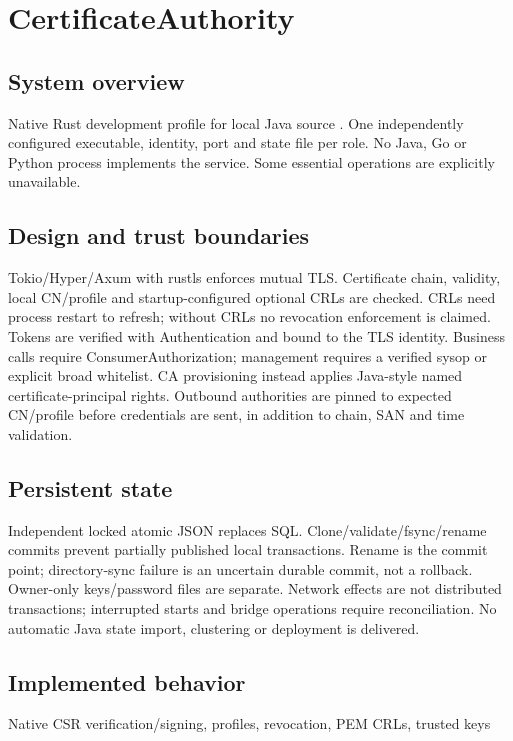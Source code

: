 \documentclass[a4paper]{arrowhead}
\begin{document}
\ArrowheadSetup
\section{CertificateAuthority}
\subsection{System overview}
Native Rust development profile for local Java source . One independently configured executable, identity, port and state file per role. No Java, Go or Python process implements the service. Some essential operations are explicitly unavailable.
\subsection{Design and trust boundaries}
Tokio/Hyper/Axum with rustls enforces mutual TLS. Certificate chain, validity, local CN/profile and startup-configured optional CRLs are checked. CRLs need process restart to refresh; without CRLs no revocation enforcement is claimed. Tokens are verified with Authentication and bound to the TLS identity. Business calls require ConsumerAuthorization; management requires a verified sysop or explicit broad whitelist. CA provisioning instead applies Java-style named certificate-principal rights. Outbound authorities are pinned to expected CN/profile before credentials are sent, in addition to chain, SAN and time validation.
\subsection{Persistent state}
Independent locked atomic JSON replaces SQL. Clone/validate/fsync/rename commits prevent partially published local transactions. Rename is the commit point; directory-sync failure is an uncertain durable commit, not a rollback. Owner-only keys/password files are separate. Network effects are not distributed transactions; interrupted starts and bridge operations require reconciliation. No automatic Java state import, clustering or deployment is delivered.
\subsection{Implemented behavior}
Native CSR verification/signing, profiles, revocation, PEM CRLs, trusted keys
\end{document}
